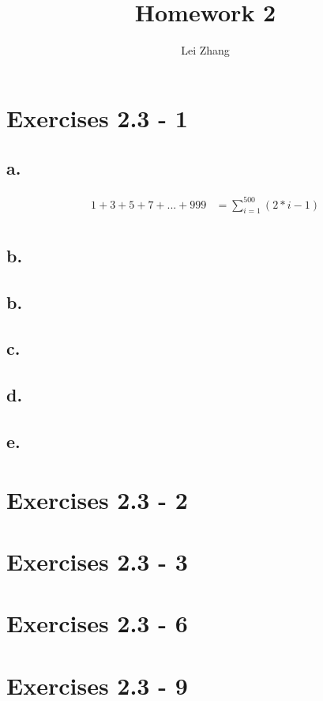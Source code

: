 \documentclass{article}
\title{Homework 2}
\author{Lei Zhang}
\begin{document}
\maketitle

\section{Exercises 2.3 - 1}

\subsection{a.}

\begin{align*}
1+ 3 + 5 + 7 + . . . + 999 &= \sum_{i=1}^{500} (2*i -1) \\
\end{align*}

\subsection{b.}

\subsection{b.}

\subsection{c.}

\subsection{d.}

\subsection{e.}

\section{Exercises 2.3 - 2}

\section{Exercises 2.3 - 3}


\section{Exercises 2.3 - 6}


\section{Exercises 2.3 - 9}
\end{document}
